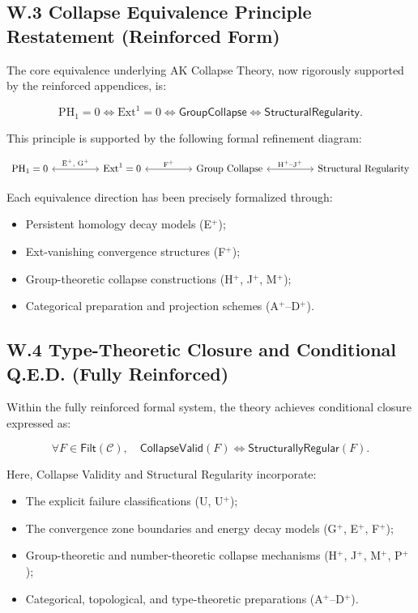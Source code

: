 \documentclass[11pt]{article}
\begin{document}
\subsection*{W.3 Collapse Equivalence Principle Restatement (Reinforced Form)}

The core equivalence underlying AK Collapse Theory, now rigorously supported by the reinforced appendices, is:

\[
\mathrm{PH}_1 = 0 \iff \mathrm{Ext}^1 = 0 \iff \mathsf{GroupCollapse} \iff \mathsf{StructuralRegularity}.
\]

This principle is supported by the following formal refinement diagram:

\[
\begin{tikzcd}[column sep=huge]
\mathrm{PH}_1 = 0 \arrow[leftrightarrow]{r}{\text{E$^{+}$, G$^{+}$}} 
& \mathrm{Ext}^1 = 0 \arrow[leftrightarrow]{r}{\text{F$^{+}$}} 
& \text{Group Collapse} \arrow[leftrightarrow]{r}{\text{H$^{+}$–J$^{+}$}} 
& \text{Structural Regularity}
\end{tikzcd}
\]

Each equivalence direction has been precisely formalized through:

\begin{itemize}
    \item Persistent homology decay models (E$^{+}$);
    \item Ext-vanishing convergence structures (F$^{+}$);
    \item Group-theoretic collapse constructions (H$^{+}$, J$^{+}$, M$^{+}$);
    \item Categorical preparation and projection schemes (A$^{+}$–D$^{+}$).
\end{itemize}

\subsection*{W.4 Type-Theoretic Closure and Conditional Q.E.D. (Fully Reinforced)}

Within the fully reinforced formal system, the theory achieves conditional closure expressed as:

\[
\forall F \in \mathsf{Filt}(\mathcal{C}), \quad \mathsf{CollapseValid}(F) \iff \mathsf{StructurallyRegular}(F).
\]

Here, Collapse Validity and Structural Regularity incorporate:

\begin{itemize}
    \item The explicit failure classifications (U, U$^{+}$);
    \item The convergence zone boundaries and energy decay models (G$^{+}$, E$^{+}$, F$^{+}$);
    \item Group-theoretic and number-theoretic collapse mechanisms (H$^{+}$, J$^{+}$, M$^{+}$, P$^{+}$);
    \item Categorical, topological, and type-theoretic preparations (A$^{+}$–D$^{+}$).
\end{itemize}
\end{document}
